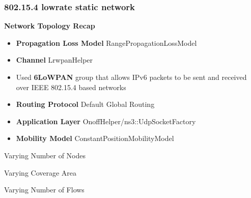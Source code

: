 \documentclass{article}[12pt]
\begin{document}






\subsubsection{802.15.4 lowrate static network}

\textbf{Network Topology Recap}

\begin{itemize}
	
	\item{\textbf{Propagation Loss Model} RangePropagationLossModel}
	\item{\textbf{Channel} LrwpanHelper}
	\item{Used \textbf{6LoWPAN} group that allows IPv6 packets to be sent and received over
		IEEE 802.15.4 based networks}
	\item{\textbf{Routing Protocol} Default Global Routing}
	\item{\textbf{Application Layer} OnoffHelper/ns3::UdpSocketFactory}
	\item{\textbf{Mobility Model} ConstantPositionMobilityModel}
	
\end{itemize}

\newpage

\vspace*{\fill}
\begin{center}
	\Large{Varying Number of Nodes}
\end{center}
\vspace*{\fill}

\newpage







\vspace*{\fill}
\begin{center}
	\Large{Varying Coverage Area}
\end{center}
\vspace*{\fill}






\vspace*{\fill}
\begin{center}
	\Large{Varying Number of Flows}
\end{center}
\vspace*{\fill}
\end{document}
